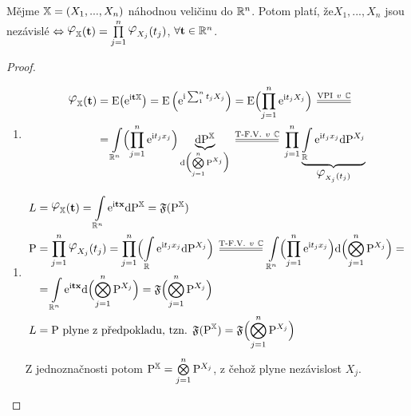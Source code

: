 \begin{theorem}
	Mějme $\mathbb{X}=(X_1,...,X_n)$ náhodnou veličinu do $\mathbb{R}^n$. Potom platí, že\newline $X_1,...,X_n$ jsou nezávislé $\Leftrightarrow \lphi_\X(\textbf{t})=\prod\limits_{j=1}^n \lphi_{X_j}(t_j)$, $\forall\textbf{t}\in\mathbb{R}^n$.
	\begin{proof}
		\begin{enumerate}[$~\Rightarrow~$:]
			\item \[
			\begin{split}
			\lphi_\X(\textbf{t})&=\E \br{\me^{\mi \textbf{t}\X}}=\E \left( \me^{\mi \sum_{1}^n t_jX_j} \right)=\E \Bigl( \prod\limits_{j=1}^n \me^{\mi t_jX_j} \Bigr)\equal{\text{VPI}~v~\C} \\ &= \int\limits_{\R^n} \Bigl( \prod\limits_{j=1}^n \me^{\mi t_jx_j} \Bigr)\underbrace{\dif\PEX}_{\dif \Br{\bigotimes\limits_{j=1}^n \PP^{X_j}}}\equal{\text{T-F.V.}~v~\C}\prod\limits_{j=1}^n \underbrace{\int\limits_{\R} \me^{\mi t_jx_j }\dif \PP^{X_j} }_{\lphi_{X_j}(t_j)}
			\end{split}
			\] 
		\end{enumerate}
		\begin{enumerate}[$\Leftarrow$:]
		\item \[
		\begin{split}
		L&=\lphi_\X(\textbf{t})=\int\limits_{\R^n}\me^{\mi \textbf{t}\textbf{x}}\dif\PEX=\mathfrak{F}(\PEX) \\
		\PP&=\prod\limits_{j=1}^n \lphi_{X_j}(t_j)=\prod\limits_{j=1}^n \Br{\int\limits_{\R}\me^{\mi t_jx_j}\dif \PP^{X_j}}\equal{\text{T-F.V.}~v~\C}\int\limits_{\R^n}\Br{ \prod\limits_{j=1}^n \me^{\mi t_jx_j}} \dif\Br{ \bigotimes\limits_{j=1}^n \PP^{X_j}}= \\ &=\int\limits_{\R^n}\me^{\mi \textbf{t}\textbf{x}}\dif\Br{\bigotimes\limits_{j=1}^n \PP^{X_j}} =\mathfrak{F} \Br{\bigotimes\limits_{j=1}^n \PP^{X_j}} \\
		L&=\PP \text{ plyne z předpokladu, tzn. } \mathfrak{F}(\PEX)=\mathfrak{F}\Bigl(\bigotimes\limits_{j=1}^n \PP^{X_j}\Bigr)
		\end{split}
		\] 
		Z jednoznačnosti potom $\mathrm{P}^{\mathbb{X}}=\bigotimes\limits_{j=1}^n \mathrm{P}^{X_j}$, z čehož plyne nezávislost $X_j$.
	\end{enumerate}
	\end{proof}
\end{theorem}
